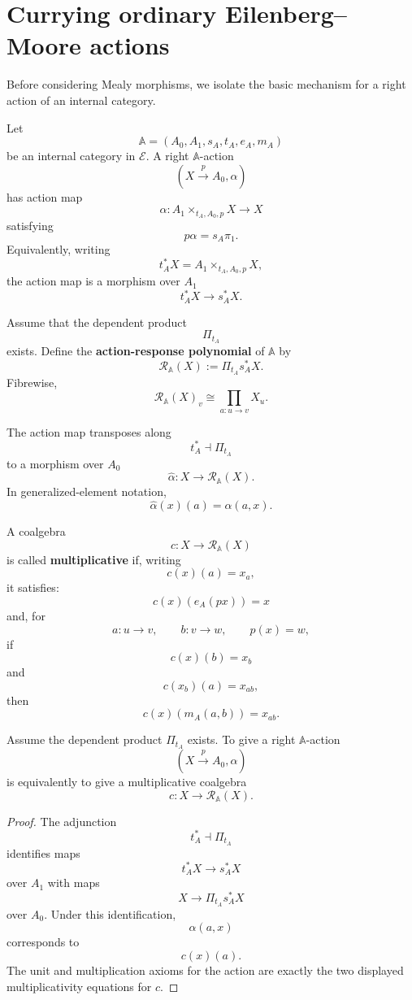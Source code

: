 \section{Currying ordinary Eilenberg--Moore actions}
\label{sec:poly-relative-currying-em-actions}

Before considering Mealy morphisms, we isolate the basic mechanism for a
right action of an internal category.

Let
\[
\mathbb A=(A_0,A_1,s_A,t_A,e_A,m_A)
\]
be an internal category in \(\mathcal E\).  A right \(\mathbb A\)-action
\[
(X\xrightarrow{p}A_0,\alpha)
\]
has action map
\[
\alpha:
A_1\times_{t_A,A_0,p}X\to X
\]
satisfying
\[
p\alpha=s_A\pi_1.
\]
Equivalently, writing
\[
t_A^\ast X=A_1\times_{t_A,A_0,p}X,
\]
the action map is a morphism over \(A_1\)
\[
t_A^\ast X\to s_A^\ast X.
\]

Assume that the dependent product
\[
\Pi_{t_A}
\]
exists.  Define the \textbf{action-response polynomial} of \(\mathbb A\) by
\[
\mathcal R_{\mathbb A}(X):=\Pi_{t_A}s_A^\ast X.
\]
Fibrewise,
\[
\mathcal R_{\mathbb A}(X)_v
\cong
\prod_{a:u\to v}X_u.
\]

The action map transposes along
\[
t_A^\ast\dashv\Pi_{t_A}
\]
to a morphism over \(A_0\)
\[
\widehat\alpha:
X\to\mathcal R_{\mathbb A}(X).
\]
In generalized-element notation,
\[
\widehat\alpha(x)(a)=\alpha(a,x).
\]

\begin{definition}
\label{def:poly-relative-multiplicative-action-coalgebra}
A coalgebra
\[
c:X\to\mathcal R_{\mathbb A}(X)
\]
is called \textbf{multiplicative} if, writing
\[
c(x)(a)=x_a,
\]
it satisfies:
\[
c(x)(e_A(px))=x
\]
and, for
\[
a:u\to v,
\qquad
b:v\to w,
\qquad
p(x)=w,
\]
if
\[
c(x)(b)=x_b
\]
and
\[
c(x_b)(a)=x_{ab},
\]
then
\[
c(x)(m_A(a,b))=x_{ab}.
\]
\end{definition}

\begin{proposition}
\label{prop:poly-relative-actions-as-response-coalgebras}
Assume the dependent product \(\Pi_{t_A}\) exists.  To give a right
\(\mathbb A\)-action
\[
(X\xrightarrow{p}A_0,\alpha)
\]
is equivalently to give a multiplicative coalgebra
\[
c:X\to\mathcal R_{\mathbb A}(X).
\]
\end{proposition}

\begin{proof}
The adjunction
\[
t_A^\ast\dashv\Pi_{t_A}
\]
identifies maps
\[
t_A^\ast X\to s_A^\ast X
\]
over \(A_1\) with maps
\[
X\to\Pi_{t_A}s_A^\ast X
\]
over \(A_0\).  Under this identification,
\[
\alpha(a,x)
\]
corresponds to
\[
c(x)(a).
\]
The unit and multiplication axioms for the action are exactly the two displayed
multiplicativity equations for \(c\).
\end{proof}

